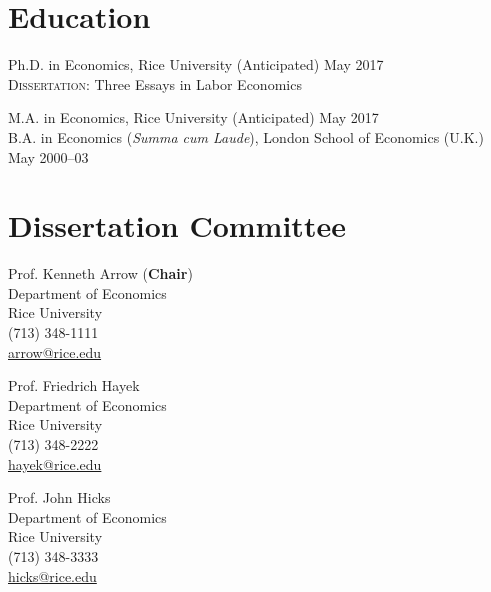 \documentclass[11pt]{res} %
\newcommand{\forceindent}{\leavevmode{\parindent=24pt\indent}}
\begin{document}
\thispagestyle{empty}


\address{
\href{mailto:dricardo@rice.edu}{dricardo@rice.edu} \\
Department of Economics MS-22 \\
Rice University, Houston, TX 77251-1892\\
(713) 348-8411
}

\begin{resume}

\section{Education}
\vspace{6pt}

Ph.D. in Economics, Rice University  \hfill (Anticipated) May 2017 \\
\forceindent \textsc{Dissertation}: Three Essays in Labor Economics

M.A. in Economics, Rice University  \hfill (Anticipated) May 2017 \\

B.A. in Economics (\emph{Summa cum Laude}), London School of Economics (U.K.)  \hfill    May 2000--03 

\section{Dissertation Committee}
\vspace{6pt}

\forceindent
\begin{minipage}[t]{0.5\textwidth}
Prof. Kenneth Arrow (\textbf{Chair}) \\
Department of Economics \\
Rice University \\
(713) 348-1111\\
\href{mailto:arrow@rice.edu}{arrow@rice.edu}

\vspace{.4cm}

Prof. Friedrich Hayek \\
Department of Economics \\
Rice University \\
(713) 348-2222\\
\href{mailto:hayek@rice.edu}{hayek@rice.edu}
\end{minipage}%
%
%
%
\begin{minipage}[t]{0.5\textwidth}
Prof. John Hicks \\
Department of Economics\\
Rice University \\
(713) 348-3333 \\
\href{mailto:hicks@rice.edu}{hicks@rice.edu}
\end{minipage}



\end{resume}
\end{document}
